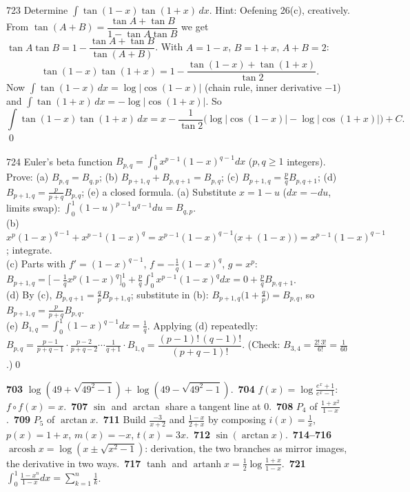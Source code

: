 \begin{bookex}{723}
Determine $\int\tan(1-x)\tan(1+x)\,dx$. Hint: Oefening 26(c), creatively.
\solution
From $\tan(A+B)=\dfrac{\tan A+\tan B}{1-\tan A\tan B}$ we get $\tan A\tan B=1-\dfrac{\tan A+\tan B}{\tan(A+B)}$. With $A=1-x$, $B=1+x$, $A+B=2$:
\[
\tan(1-x)\tan(1+x)=1-\frac{\tan(1-x)+\tan(1+x)}{\tan2}.
\]
Now $\int\tan(1-x)\,dx=\log|\cos(1-x)|$ (chain rule, inner derivative $-1$) and $\int\tan(1+x)\,dx=-\log|\cos(1+x)|$. So
\[
\int\tan(1-x)\tan(1+x)\,dx=x-\frac1{\tan2}\Big(\log|\cos(1-x)|-\log|\cos(1+x)|\Big)+C .
\]\qed
\end{bookex}

\begin{bookex}{724}
Euler's beta function $B_{p,q}=\int_0^1x^{p-1}(1-x)^{q-1}dx$ ($p,q\ge1$ integers). Prove: (a) $B_{p,q}=B_{q,p}$; (b) $B_{p+1,q}+B_{p,q+1}=B_{p,q}$; (c) $B_{p+1,q}=\frac pqB_{p,q+1}$; (d) $B_{p+1,q}=\frac p{p+q}B_{p,q}$; (e) a closed formula.
\solution
(a) Substitute $x=1-u$ ($dx=-du$, limits swap): $\int_0^1(1-u)^{p-1}u^{q-1}du=B_{q,p}$.\\
(b) $x^p(1-x)^{q-1}+x^{p-1}(1-x)^q=x^{p-1}(1-x)^{q-1}\big(x+(1-x)\big)=x^{p-1}(1-x)^{q-1}$; integrate.\\
(c) Parts with $f'=(1-x)^{q-1}$, $f=-\frac1q(1-x)^q$, $g=x^p$: $B_{p+1,q}=\Big[-\frac1qx^p(1-x)^q\Big]_0^1+\frac pq\int_0^1x^{p-1}(1-x)^qdx=0+\frac pqB_{p,q+1}$.\\
(d) By (c), $B_{p,q+1}=\frac qpB_{p+1,q}$; substitute in (b): $B_{p+1,q}\big(1+\frac qp\big)=B_{p,q}$, so $B_{p+1,q}=\frac p{p+q}B_{p,q}$.\\
(e) $B_{1,q}=\int_0^1(1-x)^{q-1}dx=\frac1q$. Applying (d) repeatedly: $B_{p,q}=\frac{p-1}{p+q-1}\cdot\frac{p-2}{p+q-2}\cdots\frac1{q+1}\cdot B_{1,q}=\dfrac{(p-1)!\,(q-1)!}{(p+q-1)!}$. (Check: $B_{3,4}=\frac{2!\,3!}{6!}=\frac1{60}$.)\qed
\end{bookex}

\begin{trybox}[{703, 704, 707, 708, 709, 711, 712, 714, 715, 716, 717, 721}]
\textbf{703} $\log(49+\sqrt{49^2-1})+\log(49-\sqrt{49^2-1})$.\ \textbf{704} $f(x)=\log\frac{e^x+1}{e^x-1}$: $f\circ f(x)=x$.\ \textbf{707} $\sin$ and $\arctan$ share a tangent line at $0$.\ \textbf{708} $P_4$ of $\frac{1+x^2}{1-x}$.\ \textbf{709} $P_5$ of $\arctan x$.\ \textbf{711} Build $\frac{-3}{x+2}$ and $\frac{1-x}{2+x}$ by composing $i(x)=\frac1x$, $p(x)=1+x$, $m(x)=-x$, $t(x)=3x$.\ \textbf{712} $\sin(\arctan x)$.\ \textbf{714--716} $\operatorname{arcosh}x=\log(x\pm\sqrt{x^2-1})$: derivation, the two branches as mirror images, the derivative in two ways.\ \textbf{717} $\tanh$ and $\operatorname{artanh}x=\frac12\log\frac{1+x}{1-x}$.\ \textbf{721} $\int_0^1\frac{1-x^n}{1-x}dx=\sum_{k=1}^n\frac1k$.
\end{trybox}

